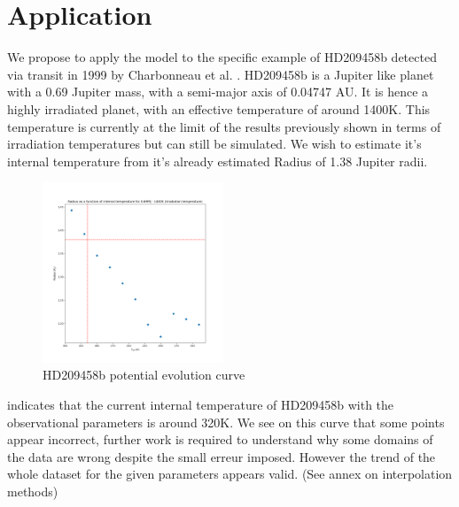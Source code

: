 \section{Application}

We propose to apply the model to the specific example of HD209458b detected via transit in 1999 by Charbonneau et al. \parencite{charbonneau_detection_2000}. HD209458b is a Jupiter like planet with a 0.69 Jupiter mass, with a semi-major axis of 0.04747 AU. It is hence a highly irradiated planet, with an effective temperature of around 1400K. This temperature is currently at the limit of the results previously shown in terms of irradiation temperatures but can still be simulated. We wish to estimate it's internal temperature from it's already estimated Radius of 1.38 Jupiter radii. 

\begin{figure}
    \centering
    \includegraphics[width=0.48\textwidth]{Images/1400_0.69.png}
    \caption{HD209458b potential evolution curve}
    \label{fig:HD209458b}
\end{figure}

 indicates that the current internal temperature of HD209458b with the observational parameters is around 320K. We see on this curve that some points appear incorrect, further work is required to understand why some domains of the data are wrong despite the small erreur imposed. However the trend of the whole dataset for the given parameters appears valid. (See annex on interpolation methods)